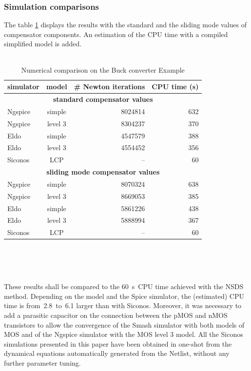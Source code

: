 \subsubsection{Simulation comparisons}
The table \ref{tab:buck} displays the results with the standard and the sliding mode values of compensator components. An estimation of the CPU time with a compiled simplified model is added.
\\
\\
\begin{table}
  \centering
  \begin{tabular}{|l|c|r|r|}
\hline
simulator & model &
{ \# Newton  iterations}
&
{ CPU  time (s)}
\\
\hline
\multicolumn{4}{|c|}{\textbf{standard compensator values}}\\
\hline
{\sc Ngspice} & simple   & 8024814 & 632 \\
{\sc Ngspice} & level 3  & 8304237 & 370 \\
\hline
{\sc Eldo}    & simple   & 4547579 & 388 \\
{\sc Eldo}    & level 3  & 4554452 & 356 \\
\hline
{\sc Siconos}    & LCP   & --  & 60 \\
\hline
\multicolumn{4}{|c|}{\textbf{sliding mode compensator values}}\\
\hline
{\sc Ngspice} & simple   & 8070324 & 638 \\
{\sc Ngspice} & level 3  & 8669053 & 385 \\
\hline
{\sc Eldo}    & simple   & 5861226 & 438 \\
{\sc Eldo}    & level 3  & 5888994 & 367 \\
\hline
{\sc Siconos}    & LCP   & -- & 60 \\
\hline
\end{tabular}\\
\caption{Numerical comparison on the Buck converter Example}
\label{tab:buck}
\end{table}
\\
\\
These results shall be compared to the 60~s~CPU time achieved with the NSDS method.
Depending on the model and the {\sc Spice} simulator, the (estimated) CPU time is from~2.8~to~6.1
larger than with {\sc Siconos}. Moreover, it was necessary to add a parasitic capacitor on the connection between the pMOS and nMOS
transistors to allow the convergence of the {\sc Smash} simulator with both models of MOS
and of the {\sc Ngspice} simulator with the MOS level 3 model. All the {\sc Siconos} simulations
presented in this paper have been obtained in one-shot from the dynamical equations automatically
generated from the Netlist, without any further parameter tuning.

